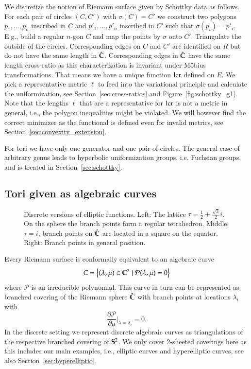 \documentclass[Thesis]{subfiles}
\begin{document}
We discretize the notion of Riemann surface given by Schottky data as follows.
For each pair of circles $(C, C')$ with $\sigma(C) =C'$ we construct two polygons $p_1,\ldots,p_n$ inscribed in $C$ and $p'_1,\ldots,p'_n$ inscribed in $C'$ such that $\sigma(p_i)=p'_i$. E.g., build a regular $n$-gon $C$ and map the points by $\sigma$ onto $C'$.
Triangulate the outside of the circles.
Corresponding edges on $C$ and $C'$ are identified on $R$ but do not have the same length in $\Chat$.
Corresponding edges in $\Chat$ have the same length cross-ratio as this characterization is invariant under M\"{o}bius transformations.
That means we have a unique function $\lcr$ defined on $E$.
We pick a representative metric $\ell$ to feed into the variational principle and calculate the uniformization, see Section~\ref{sec:cross-ratios} and Figure~\ref{fig:schottky_g1}.
Note that the lengths $\ell$ that are a representative for $\lcr$ is not a metric in general, i.e., the polygon inequalities might be violated. 
We will however find the correct minimizer as the functional is defined even for invalid metrics, see Section~\ref{sec:convexity_extension}.

For tori we have only one generator and one pair of circles. 
The general case of arbitrary genus leads to hyperbolic uniformization groups, i.e. Fuchsian groups, and is treated in Section~\ref{sec:schottky}.

\subsection{Tori given as algebraic curves}
\label{sec:discrete_algebraic_curves}

\begin{figure}
\centering
{}
\caption{Discrete versions of elliptic functions. Left: The lattice $\tau=\frac{1}{2}+\frac{\sqrt 3}{2}i$. On the sphere the branch points form a regular tetrahedron. Middle: $\tau=i$, branch points on $\hat \C$ are located in a square on the equator. Right: Branch points in general position.}
\label{fig:p_functions}
\end{figure}

Every Riemann surface is conformally equivalent to an algebraic curve
\[C=\left\{(\lambda,\mu)\in \C^2 \mid \mathcal P(\lambda,\mu)=0\right\}\]
where $\mathcal P$ is an irreducible polynomial.
This curve in turn can be represented as branched covering of the Riemann sphere $\hat{\C}$ with branch points at locations $\lambda_i$ with \[\frac{\partial\mathcal P}{\partial \mu}\Bigr|_{\lambda=\lambda_i} = 0.\]
In the discrete setting we represent discrete algebraic curves as triangulations of the respective branched covering of $\S^2$.
We only cover 2-sheeted coverings here as this includes our main examples, i.e., elliptic curves and hyperelliptic curves, see also Section~\ref{sec:hyperelliptic}.
\end{document}
